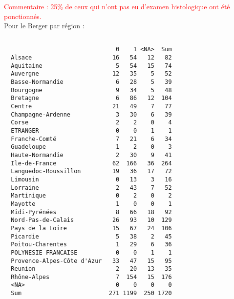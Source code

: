\documentclass[11pt,a4paper]{article}\usepackage[]{graphicx}\usepackage[]{color}
\makeatletter
\newenvironment{kframe}{%
 \def\at@end@of@kframe{}%
 \ifinner\ifhmode%
  \def\at@end@of@kframe{\end{minipage}}%
  \begin{minipage}{\columnwidth}%
 \fi\fi%
 \def\FrameCommand##1{\hskip\@totalleftmargin \hskip-\fboxsep
 \colorbox{shadecolor}{##1}\hskip-\fboxsep
     \hskip-\linewidth \hskip-\@totalleftmargin \hskip\columnwidth}%
 \MakeFramed {\advance\hsize-\width
   \@totalleftmargin\z@ \linewidth\hsize
   \@setminipage}}%
 {\par\unskip\endMakeFramed%
 \at@end@of@kframe}
\newenvironment{knitrout}{}{} %
\makeatother
\begin{document}
\textcolor{red}{Commentaire : 25\% de ceux qui n'ont pas eu d'examen histologique ont été ponctionnés.}
~\\

Pour le Berger par région :

\begin{knitrout}
\color{fgcolor}\begin{kframe}
\begin{verbatim}
                            
                                0    1 <NA>  Sum
  Alsace                       16   54   12   82
  Aquitaine                     5   54   15   74
  Auvergne                     12   35    5   52
  Basse-Normandie               6   28    5   39
  Bourgogne                     9   34    5   48
  Bretagne                      6   86   12  104
  Centre                       21   49    7   77
  Champagne-Ardenne             3   30    6   39
  Corse                         2    2    0    4
  ETRANGER                      0    0    1    1
  Franche-Comté                 7   21    6   34
  Guadeloupe                    1    2    0    3
  Haute-Normandie               2   30    9   41
  Ile-de-France                62  166   36  264
  Languedoc-Roussillon         19   36   17   72
  Limousin                      0   13    3   16
  Lorraine                      2   43    7   52
  Martinique                    0    2    0    2
  Mayotte                       1    0    0    1
  Midi-Pyrénées                 8   66   18   92
  Nord-Pas-de-Calais           26   93   10  129
  Pays de la Loire             15   67   24  106
  Picardie                      5   38    2   45
  Poitou-Charentes              1   29    6   36
  POLYNESIE FRANCAISE           0    0    1    1
  Provence-Alpes-Côte d'Azur   33   47   15   95
  Reunion                       2   20   13   35
  Rhône-Alpes                   7  154   15  176
  <NA>                          0    0    0    0
  Sum                         271 1199  250 1720
                            

\end{verbatim}
\end{kframe}
\end{knitrout}
\end{document}
